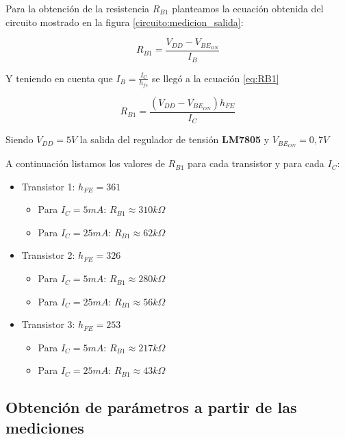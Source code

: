 \documentclass[10pt,spanish,a4paper,openany,notitlepage]{article}
\begin{document}
Para la obtención de la resistencia $R_{B1}$ planteamos la ecuación obtenida del circuito mostrado en la figura \ref{circuito:medicion_salida}:

\[ \displaystyle R_{B1} = \frac{V_{DD} - V_{BE_{ON}}}{I_B} \]


Y teniendo en cuenta que $I_B = \frac{I_C}{h_{fe}}$ se llegó a la ecuación \ref{eq:RB1}

\begin{equation}
R_{B1} = \frac{(V_{DD} - V_{BE_{ON}}) h_{FE}}{I_C}
\label{eq:RB1}
\end{equation}

Siendo $V_{DD} = 5 \unit{V}$ la salida del regulador de tensión  \textbf{LM7805} y $V_{BE_{ON}} = 0,7 \unit{V}$

A continuación listamos los valores de $R_{B1}$ para cada transistor y para cada $I_C$:

\begin{itemize}

\item{Transistor 1:} $h_{FE} = 361$

\begin{itemize}
\item{Para $I_C = 5 \unit{mA}$}: $R_{B1} \approx 310 \unit{k\Omega}$
\item{Para $I_C = 25 \unit{mA}$}: $R_{B1} \approx  62\unit{k\Omega}$
\end{itemize}

\item{Transistor 2:} $h_{FE} = 326$

\begin{itemize}
\item{Para $I_C = 5 \unit{mA}$}: $R_{B1} \approx  280\unit{k\Omega}$
\item{Para $I_C = 25 \unit{mA}$}: $R_{B1} \approx  56\unit{k\Omega}$
\end{itemize}

\item{Transistor 3:} $h_{FE} = 253$

\begin{itemize}
\item{Para $I_C = 5 \unit{mA}$}: $R_{B1} \approx  217\unit{k\Omega}$
\item{Para $I_C = 25 \unit{mA}$}: $R_{B1} \approx  43\unit{k\Omega}$
\end{itemize}

\end{itemize}

\subsection{Obtención de parámetros a partir de las mediciones}
\end{document}
